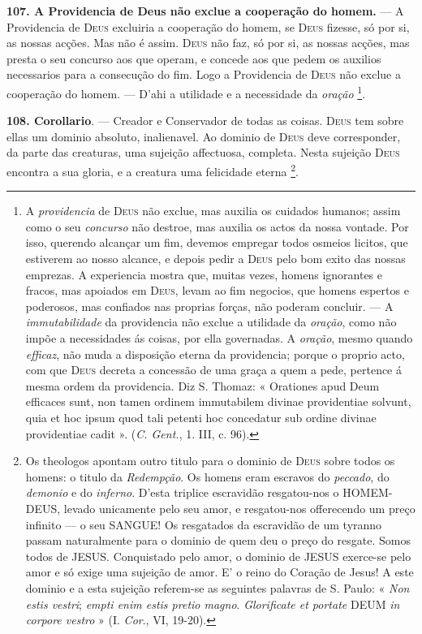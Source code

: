 \textbf{107. A Providencia de Deus não exclue a cooperação do homem.} --- A Providencia de \textsc{Deus} excluiria a cooperação do homem, se \textsc{Deus} fizesse, só por si, as nossas acções. Mas não é assim. \textsc{Deus} não faz, só por si, as nossas acções, mas presta o seu concurso aos que operam, e concede aos que pedem os auxilios necessarios para a consecução do fim. Logo a Providencia de \textsc{Deus} não exclue a cooperação do homem. --- D'ahi a utilidade e a necessidade da \emph{oração} \footnote{A \emph{providencia} de \textsc{Deus} não exclue, mas auxilia os cuidados humanos; assim como o seu \emph{concurso} não destroe, mas auxilia os actos da nossa vontade. Por isso, querendo alcançar um fim, devemos empregar todos osmeios licitos, que estiverem ao nosso alcance, e depois pedir a \textsc{Deus} pelo bom exito das nossas emprezas. A experiencia mostra que, muitas vezes, homens ignorantes e fracos, mas apoiados em \textsc{Deus}, levam ao fim negocios, que homens espertos e poderosos, mas confiados nas proprias forças, não poderam concluir. --- A \emph{immutabilidade} da providencia não exclue a utilidade da \emph{oração}, como não impõe a necessidades ás coisas, por ella governadas. A \emph{oração}, mesmo quando \emph{efficaz}, não muda a disposição eterna da providencia; porque o proprio acto, com que \textsc{Deus} decreta a concessão de uma graça a quem a pede, pertence á mesma ordem da providencia. Diz S. Thomaz: « Orationes apud Deum efficaces sunt, non tamen ordinem immutabilem divinae providentiae solvunt, quia et hoc ipsum quod tali petenti hoc concedatur sub ordine divinae providentiae cadit ». (\emph{C. Gent.}, 1. III, c. 96).}.

 \textbf{108. Corollario}. --- Creador e Conservador de todas as coisas. \textsc{Deus} tem sobre ellas um dominio absoluto, inalienavel. Ao dominio de \textsc{Deus} deve corresponder, da parte das creaturas, uma sujeição affectuosa, completa. Nesta sujeição \textsc{Deus} encontra a sua gloria, e a creatura uma felicidade eterna \footnote{Os theologos apontam outro titulo para o dominio de \textsc{Deus} sobre todos os homens: o titulo da \emph{Redempção}. Os homens eram escravos do \emph{peccado}, do \emph{demonio} e do \emph{inferno}. D'esta triplice escravidão resgatou-nos o \textsc{HOMEM-DEUS}, levado unicamente pelo seu amor, e resgatou-nos offerecendo um preço infinito --- o seu \textsc{SANGUE}! Os resgatados da escravidão de um tyranno passam naturalmente para o dominio de quem deu o preço do resgate. Somos todos de \textsc{JESUS}. Conquistado pelo amor, o dominio de \textsc{JESUS} exerce-se pelo amor e só exige uma sujeição de amor. E' o reino do Coração de Jesus! A este dominio e a esta sujeição referem-se as seguintes palavras de S. Paulo: « \emph{Non estis vestri}; \emph{empti enim estis pretio magno}. \emph{Glorificate et portate} \textsc{DEUM} \emph{in corpore vestro} » (I. \emph{Cor}., VI, 19-20).}.

